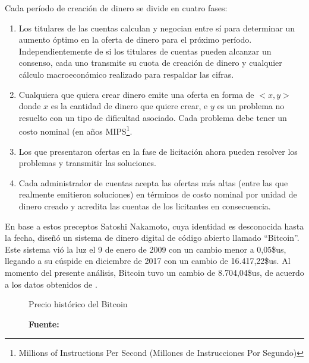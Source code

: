 \documentclass[../main/main.tex]{subfiles}
\begin{document}
  Cada período de creación de dinero se divide en cuatro fases:

  \begin{enumerate}
    \item Los titulares de las cuentas calculan y negocian entre sí para determinar un aumento óptimo en la oferta de dinero para el próximo período. Independientemente de si los titulares de cuentas pueden alcanzar un consenso, cada uno transmite su cuota de creación de dinero y cualquier cálculo macroeconómico realizado para respaldar las cifras.
    \item Cualquiera que quiera crear dinero emite una oferta en forma de $<x, y>$ donde $x$ es la cantidad de dinero que quiere crear, e $y$ es un problema no resuelto con un tipo de dificultad asociado. Cada problema debe tener un costo nominal (en años MIPS\footnote{Millions of Instructions Per Second (Millones de Instrucciones Por Segundo)}.
    \item Los que presentaron ofertas en la fase de licitación ahora pueden resolver los problemas y transmitir las soluciones.
    \item Cada administrador de cuentas acepta las ofertas más altas (entre las que realmente emitieron soluciones) en términos de costo nominal por unidad de dinero creado y acredita las cuentas de los licitantes en consecuencia.
  \end{enumerate}

  En base a estos preceptos Satoshi Nakamoto, cuya identidad es desconocida hasta la fecha, diseñó un sistema de dinero digital de código abierto llamado ``Bitcoin''. Este sistema vió la luz el 9 de enero de 2009 con un cambio menor a 0,05\$us, llegando a su cúspide en diciembre de 2017 con un cambio de 16.417,22\$us. Al momento del presente análisis, Bitcoin tuvo un cambio de 8.704,04\$us, de acuerdo a los datos obtenidos de \cite{web:bitstamp}.

  \begin{figure}[H]
    \centering
    \caption{Precio histórico del Bitcoin}
    \newcommand\csvfile{../inc/marco_teorico/bitcoin_price.csv}
    \pgfplotstableread[col sep=comma]{\csvfile}\datatable
    \caption*{\textbf{Fuente:} \cite{web:bitstamp}}
  \end{figure}
\end{document}
